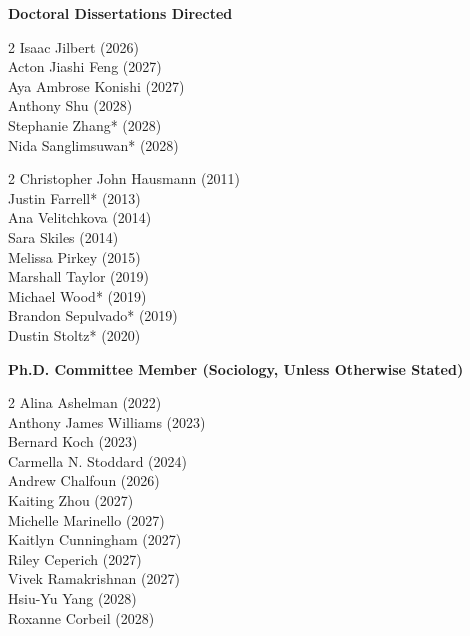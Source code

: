 
\noindent \textbf{Doctoral Dissertations Directed }

\begin{multicols}{2}
   \noindent
    Isaac Jilbert (2026) \\
    Acton Jiashi Feng (2027) \\
    Aya Ambrose Konishi (2027) \\
    Anthony Shu (2028) \\
    Stephanie Zhang\textcolor{uclablue}{*} (2028) \\
    Nida Sanglimsuwan\textcolor{uclablue}{*} (2028) 
\end{multicols}

\begin{multicols}{2}
    \noindent
    Christopher John Hausmann (2011) \\
    Justin Farrell\textcolor{uclablue}{*} (2013) \\
    Ana Velitchkova (2014) \\
    Sara Skiles (2014) \\
    Melissa Pirkey (2015) \\
    Marshall Taylor (2019) \\
    Michael Wood\textcolor{uclablue}{*} (2019) \\
    Brandon Sepulvado\textcolor{uclablue}{*} (2019) \\
    Dustin Stoltz\textcolor{uclablue}{*} (2020) 
\end{multicols}
\medskip

\noindent \textbf{Ph.D. Committee Member (Sociology, Unless Otherwise Stated)} 

\begin{multicols}{2} \noindent
    Alina Ashelman (2022) \\
    Anthony James Williams (2023) \\
    Bernard Koch (2023) \\
    Carmella N. Stoddard (2024) \\
    Andrew Chalfoun (2026) \\
    Kaiting Zhou (2027) \\
    Michelle Marinello (2027) \\
    Kaitlyn Cunningham (2027) \\
    Riley Ceperich (2027) \\
    Vivek Ramakrishnan (2027) \\
    Hsiu-Yu Yang (2028) \\
    Roxanne Corbeil (2028) 
\end{multicols}
\medskip


